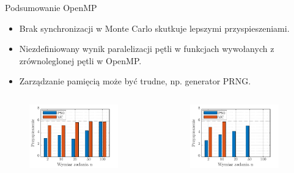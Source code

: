 \documentclass[handout]{beamer}
\begin{document}
\begin{frame}{Podsumowanie OpenMP}
\begin{itemize}
\item Brak synchronizacji w Monte Carlo skutkuje lepszymi przyspieszeniami.
\item Niezdefiniowany wynik paralelizacji pętli w funkcjach wywołanych z zrównoleglonej pętli w OpenMP.
\item Zarządzanie pamięcią może być trudne, np. generator PRNG.
\end{itemize}
\begin{columns}
\begin{column}[t]{0.5\textwidth}

\begin{figure}[t]
\includegraphics[width=0.9\textwidth]{grafiki/tabela_zad1_przyspieszenie.pdf}
\end{figure}

\end{column}
\begin{column}[t]{0.5\textwidth}

\begin{figure}[t]
\includegraphics[width=0.9\textwidth]{grafiki/tabela_zad2_przyspieszenie.pdf}
\end{figure}

\end{column}
\end{columns}
\end{frame}
\end{document}
